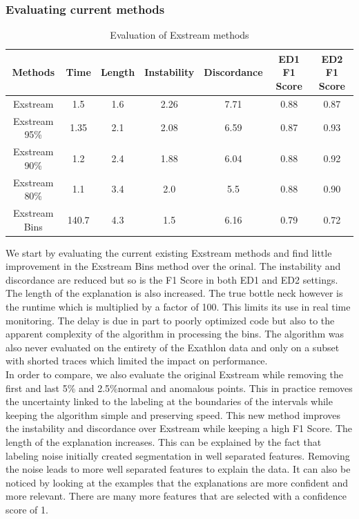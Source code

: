 \documentclass[oneside, a4paper, onecolumn, 11pt]{article}
\begin{document}
\subsubsection{Evaluating current methods}
\begin{table}[h]
  \centering
  \begin{tabular}{|c|c|c|c|c|c|c|}
      \hline
      Methods & Time & Length & Instability & Discordance & ED1 F1 Score & ED2 F1 Score\\ 
      \hline
      Exstream  & 1.5  & 1.6  & 2.26  & 7.71 & 0.88 & 0.87  \\ 
      Exstream 95\%  & 1.35  & 2.1  & 2.08  & 6.59 & 0.87 & 0.93\\ 
      Exstream 90\%  & 1.2  & 2.4  & 1.88  & 6.04 & 0.88 & 0.92\\ 
      Exstream 80\% & 1.1 & 3.4 & 2.0 & 5.5 & 0.88 & 0.90 \\
      Exstream Bins  & 140.7  & 4.3  & 1.5  & 6.16 & 0.79 & 0.72 \\ 
      \hline
  \end{tabular}
  \caption{Evaluation of Exstream methods}
  \label{tab:example}
\end{table}
We start by evaluating the current existing Exstream methods and find little improvement in the Exstream Bins method over the orinal. The instability and discordance are reduced but so is the F1 Score in both ED1 and ED2 settings. The length of the explanation is also increased. The true bottle neck however is the runtime which is multiplied by a factor of 100. This limits its use in real time monitoring. The delay is due in part to poorly optimized code but also to the apparent complexity of the algorithm in processing the bins. The algorithm was also never evaluated on the entirety of the Exathlon data and only on a subset with shorted traces which limited the impact on performance.\\ 
In order to compare, we also evaluate the original Exstream while removing the first and last 5\% and 2.5\%normal and anomalous points. This in practice removes the uncertainty linked to the labeling at the boundaries of the intervals while keeping the algorithm simple and preserving speed. This new method improves the instability and discordance over Exstream while keeping a high F1 Score. The length of the explanation increases. This can be explained by the fact that labeling noise initially created segmentation in well separated features. Removing the noise leads to more well separated features to explain the data.  It can also be noticed by looking at the examples that the explanations are more confident and more relevant. There are many more features that are selected with a confidence score of 1. \\
\end{document}
